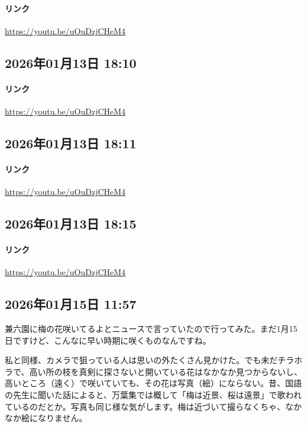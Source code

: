 \paragraph{リンク}
\url{https://youtu.be/uOuDzjCHeM4}

\subsection*{2026年01月13日 18:10}

\paragraph{リンク}
\url{https://youtu.be/uOuDzjCHeM4}

\subsection*{2026年01月13日 18:11}

\paragraph{リンク}
\url{https://youtu.be/uOuDzjCHeM4}

\subsection*{2026年01月13日 18:15}

\paragraph{リンク}
\url{https://youtu.be/uOuDzjCHeM4}

\subsection*{2026年01月15日 11:57}

兼六園に梅の花咲いてるよとニュースで言っていたので行ってみた。まだ1月15日ですけど、こんなに早い時期に咲くものなんですね。

私と同様、カメラで狙っている人は思いの外たくさん見かけた。でも未だチラホラで、高い所の枝を真剣に探さないと開いている花はなかなか見つからないし、高いところ（遠く）で咲いていても、その花は写真（絵）にならない。昔、国語の先生に聞いた話によると、万葉集では概して「梅は近景、桜は遠景」で歌われているのだとか。写真も同じ様な気がします。梅は近づいて撮らなくちゃ、なかなか絵になりません。


